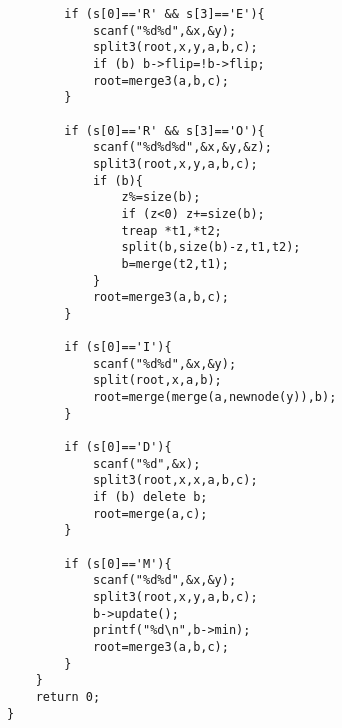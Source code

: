 \documentclass{article}
\begin{document}
\begin{lstlisting}
		if (s[0]=='R' && s[3]=='E'){
			scanf("%d%d",&x,&y);
			split3(root,x,y,a,b,c);
			if (b) b->flip=!b->flip;
			root=merge3(a,b,c);
		}
		
		if (s[0]=='R' && s[3]=='O'){
			scanf("%d%d%d",&x,&y,&z);
			split3(root,x,y,a,b,c);
			if (b){
				z%=size(b);
				if (z<0) z+=size(b);
				treap *t1,*t2;
				split(b,size(b)-z,t1,t2);
				b=merge(t2,t1);
			}
			root=merge3(a,b,c);
		}
		
		if (s[0]=='I'){
			scanf("%d%d",&x,&y);
			split(root,x,a,b);
			root=merge(merge(a,newnode(y)),b);
		}
		
		if (s[0]=='D'){
			scanf("%d",&x);
			split3(root,x,x,a,b,c);
			if (b) delete b;
			root=merge(a,c);
		}
		
		if (s[0]=='M'){
			scanf("%d%d",&x,&y);
			split3(root,x,y,a,b,c);
			b->update();
			printf("%d\n",b->min);
			root=merge3(a,b,c);
		}
	}
	return 0;
}
\end{lstlisting}
\end{document}

